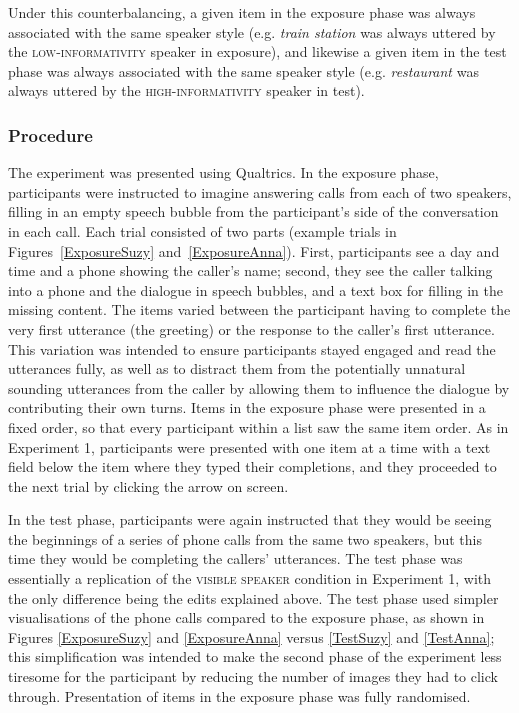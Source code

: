 \documentclass[output=paper,colorlinks,citecolor=brown]{langscibook}
\begin{document}
Under this counterbalancing, a given item in the exposure phase was always associated with the same speaker style (e.g. \textit{train station} was always uttered by the \textsc{low-informativity} speaker in exposure), and likewise a given item in the test phase was always associated with the same speaker style (e.g. \textit{restaurant} was always uttered by the \textsc{high-informativity} speaker in test).

\subsubsection{Procedure}

The experiment was presented using Qualtrics. In the exposure phase, participants were instructed to imagine answering calls from each of two speakers, filling in an empty speech bubble from the participant’s side of the conversation in each call. Each trial consisted of two parts (example trials in Figures~\ref{ExposureSuzy} and~\ref{ExposureAnna}). First, participants see a day and time and a phone showing the caller's name; second, they see the caller talking into a phone and the dialogue in speech bubbles, and a text box for filling in the missing content. The items varied between the participant having to complete the very first utterance (the greeting) or the response to the caller’s first utterance. This variation was intended to ensure participants stayed engaged and read the utterances fully, as well as to distract them from the potentially unnatural sounding utterances from the caller by allowing them to influence the dialogue by contributing their own turns. Items in the exposure phase were presented in a fixed order, so that every participant within a list saw the same item order. As in Experiment 1, participants were presented with one item at a time with a text field below the item where they typed their completions, and they proceeded to the next trial by clicking the arrow on screen.
 
In the test phase, participants were again instructed that they would be seeing the beginnings of a series of phone calls from the same two speakers, but this time they would be completing the callers’ utterances. The test phase was essentially a replication of the \textsc{visible speaker} condition in Experiment 1, with the only difference being the edits explained above. The test phase used simpler visualisations of the phone calls compared to the exposure phase, as shown in Figures \ref{ExposureSuzy} and \ref{ExposureAnna} versus \ref{TestSuzy} and \ref{TestAnna}; this simplification was intended to make the second phase of the experiment less tiresome for the participant by reducing the number of images they had to click through. Presentation of items in the exposure phase was fully randomised.
\end{document}
